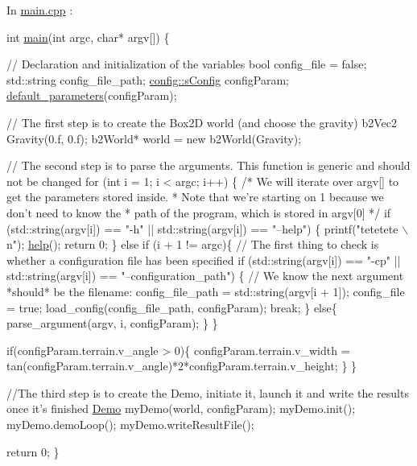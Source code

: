 In \mbox{\hyperlink{main_8cpp}{main.\+cpp}} \+: 
\begin{DoxyCode}
\textcolor{keywordtype}{int} \mbox{\hyperlink{main_8cpp_a0ddf1224851353fc92bfbff6f499fa97}{main}}(\textcolor{keywordtype}{int} argc, \textcolor{keywordtype}{char}* argv[])
\{

 \textcolor{comment}{// Declaration and initialization of the variables}
 \textcolor{keywordtype}{bool} config\_file = \textcolor{keyword}{false};
 std::string config\_file\_path;
 \mbox{\hyperlink{structconfig_1_1s_config}{config::sConfig}} configParam;
 \mbox{\hyperlink{main_8cpp_a075854c1227ffd274988d62bb5c859a1}{default\_parameters}}(configParam);

 \textcolor{comment}{// The first step is to create the Box2D world (and choose the gravity)}
 b2Vec2 Gravity(0.f, 0.f);
 b2World* world = \textcolor{keyword}{new} b2World(Gravity);

 \textcolor{comment}{// The second step is to parse the arguments. This function is generic and should not be changed}
 \textcolor{keywordflow}{for} (\textcolor{keywordtype}{int} i = 1; i < argc; i++) \{ \textcolor{comment}{/* We will iterate over argv[] to get the parameters stored inside.}
\textcolor{comment}{                                      * Note that we're starting on 1 because we don't need to know the}
\textcolor{comment}{                                      * path of the program, which is stored in argv[0] */}
     \textcolor{keywordflow}{if} (std::string(argv[i]) == \textcolor{stringliteral}{"-h"} || std::string(argv[i]) == \textcolor{stringliteral}{"--help"}) \{
       printf(\textcolor{stringliteral}{"tetetete \(\backslash\)n"});
       \mbox{\hyperlink{main_8cpp_a97ee70a8770dc30d06c744b24eb2fcfc}{help}}();
       \textcolor{keywordflow}{return} 0;
     \}
     \textcolor{keywordflow}{else} \textcolor{keywordflow}{if} (i + 1 != argc)\{
              \textcolor{comment}{// The first thing to check is whether a configuration file has been specified}
       \textcolor{keywordflow}{if} (std::string(argv[i]) == \textcolor{stringliteral}{"-cp"} || std::string(argv[i]) == \textcolor{stringliteral}{"--configuration\_path"}) \{
              \textcolor{comment}{// We know the next argument *should* be the filename:}
              config\_file\_path = std::string(argv[i + 1]);
               config\_file = \textcolor{keyword}{true};
                load\_config(config\_file\_path, configParam);
                 \textcolor{keywordflow}{break};
       \}
       \textcolor{keywordflow}{else}\{
         parse\_argument(argv, i, configParam);
       \}
     \}

     \textcolor{keywordflow}{if}(configParam.terrain.v\_angle > 0)\{
       configParam.terrain.v\_width = tan(configParam.terrain.v\_angle)*2*configParam.terrain.v\_height;
     \}
 \}

 \textcolor{comment}{//The third step is to create the Demo, initiate it, launch it and write the results once it's finished}
 \mbox{\hyperlink{class_demo}{Demo}} myDemo(world, configParam);
 myDemo.init();
 myDemo.demoLoop();
 myDemo.writeResultFile();

 \textcolor{keywordflow}{return} 0;
\}
\end{DoxyCode}


